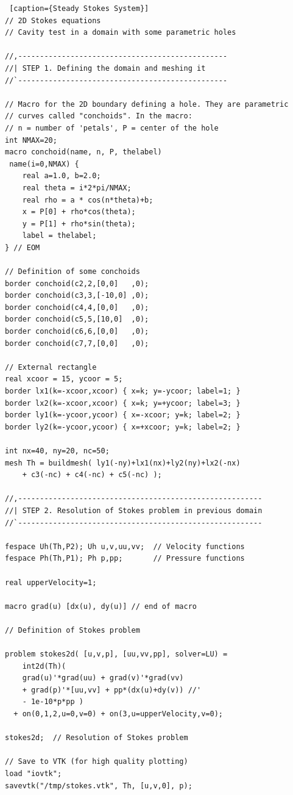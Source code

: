 \documentclass[12pt]{article}
\begin{document}
\lstset{language=freefem++}
\begin{lstlisting} [caption={Steady Stokes System}]
// 2D Stokes equations
// Cavity test in a domain with some parametric holes

//,------------------------------------------------
//| STEP 1. Defining the domain and meshing it
//`------------------------------------------------

// Macro for the 2D boundary defining a hole. They are parametric
// curves called "conchoids". In the macro:
// n = number of 'petals', P = center of the hole
int NMAX=20;
macro conchoid(name, n, P, thelabel)
 name(i=0,NMAX) {
    real a=1.0, b=2.0;
    real theta = i*2*pi/NMAX;
    real rho = a * cos(n*theta)+b;
    x = P[0] + rho*cos(theta);
    y = P[1] + rho*sin(theta);
    label = thelabel;
} // EOM

// Definition of some conchoids
border conchoid(c2,2,[0,0]   ,0);
border conchoid(c3,3,[-10,0] ,0);
border conchoid(c4,4,[0,0]   ,0);
border conchoid(c5,5,[10,0]  ,0);
border conchoid(c6,6,[0,0]   ,0);
border conchoid(c7,7,[0,0]   ,0);

// External rectangle
real xcoor = 15, ycoor = 5;
border lx1(k=-xcoor,xcoor) { x=k; y=-ycoor; label=1; }
border lx2(k=-xcoor,xcoor) { x=k; y=+ycoor; label=3; }
border ly1(k=-ycoor,ycoor) { x=-xcoor; y=k; label=2; }
border ly2(k=-ycoor,ycoor) { x=+xcoor; y=k; label=2; }

int nx=40, ny=20, nc=50;
mesh Th = buildmesh( ly1(-ny)+lx1(nx)+ly2(ny)+lx2(-nx)
    + c3(-nc) + c4(-nc) + c5(-nc) );

//,--------------------------------------------------------
//| STEP 2. Resolution of Stokes problem in previous domain
//`--------------------------------------------------------

fespace Uh(Th,P2); Uh u,v,uu,vv;  // Velocity functions
fespace Ph(Th,P1); Ph p,pp;       // Pressure functions

real upperVelocity=1;

macro grad(u) [dx(u), dy(u)] // end of macro

// Definition of Stokes problem

problem stokes2d( [u,v,p], [uu,vv,pp], solver=LU) =
    int2d(Th)(
	grad(u)'*grad(uu) + grad(v)'*grad(vv)
	+ grad(p)'*[uu,vv] + pp*(dx(u)+dy(v)) //'
	- 1e-10*p*pp )
  + on(0,1,2,u=0,v=0) + on(3,u=upperVelocity,v=0);

stokes2d;  // Resolution of Stokes problem

// Save to VTK (for high quality plotting)
load "iovtk";
savevtk("/tmp/stokes.vtk", Th, [u,v,0], p);
\end{lstlisting}
\end{document}
